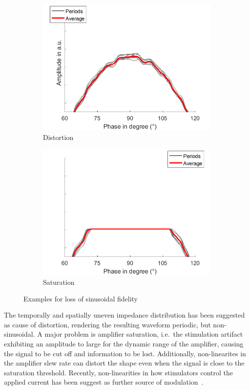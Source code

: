 \documentclass[a4paper]{article}
\begin{document}
\begin{figure}[hbtp]
    \begin{subfigure}{.5\textwidth}
    \includegraphics[width=\textwidth]{./img/intro/distortion.png}
    \caption{Distortion}\label{fig:distortion}
    \end{subfigure}
    \begin{subfigure}{.5\textwidth}
    \includegraphics[width=\textwidth]{./img/intro/saturation.png}
    \caption{Saturation}\label{fig:saturation}
    \end{subfigure}
    \caption{Examples for loss of sinusoidal fidelity}\label{fig:nonsinus}
\end{figure}

The temporally and spatially uneven impedance distribution has been suggested as cause of distortion, rendering the resulting waveform periodic, but non-sinusoidal. A major problem is amplifier saturation, i.e.\ the stimulation artifact exhibiting an amplitude to large for the dynamic range of the amplifier, causing the signal to be cut off and information to be lost.
Additionally, non-linearites in the amplifier slew rate can distort the shape even when the signal is close to the saturation threshold. Recently, non-linearities in how stimulators control the applied current has been suggest as further source of modulation~\citep{Neuling_2017}.
\end{document}
